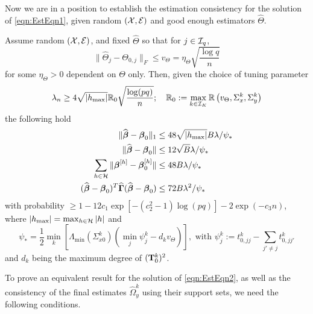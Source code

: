 \noindent Now we are in a position to establish the estimation consistency for the solution of \eqref{eqn:EstEqn1}, given random $({\cal{X}}, {\cal{E}})$ and good enough estimators $\widehat \Theta$.

\begin{Theorem}\label{thm:thm-B}
Assume random $({\cal{X}}, {\cal{E}})$, and fixed $\widehat \Theta$ so that for $j \in {\cal{I}}_q$,
%
\[
\| \widehat \Theta_j - \Theta_{0,j} \|_F \leq v_\Theta  = \eta_\Theta \sqrt{\frac{\log q}{n}}
\]
%
for some $\eta_\Theta > 0$ dependent on $\Theta$ only. Then, given the choice of tuning parameter
%
$$
\lambda_n \geq 4 \sqrt{| h_{\max} |} {\mathbb{R}}_0 \sqrt{ \frac{ \log(pq)}{n}}; \quad 
{\mathbb{R}}_0 := \max_{k \in {\cal{I}}_K} {\mathbb{R}} \left(v_\Theta, \Sigma_x^k, \Sigma_y^k \right)
$$
%
the following hold
%
\begin{align}
\| \widehat {{\boldsymbol{\beta}}} - {\boldsymbol{\beta}}_0 \|_1 & \leq 48 \sqrt{ | h_{\max} |} B \lambda/ \psi_* \label{eqn:BetaThmEqn1}\\
\| \widehat {{\boldsymbol{\beta}}} - {\boldsymbol{\beta}}_0 \| & \leq 12 \sqrt B \lambda/ \psi_* \label{eqn:BetaThmEqn2}\\
\sum_{h \in {\cal{H}}} \| {\boldsymbol{\beta}}^{[h]} - {\boldsymbol{\beta}}_0^{[h]} \| & \leq 48 B \lambda/ \psi_* \label{eqn:BetaThmEqn3}\\
(\widehat {{\boldsymbol{\beta}}} - {\boldsymbol{\beta}}_0 )^T \widehat {{\boldsymbol{\Gamma}}} (\widehat {{\boldsymbol{\beta}}} - {\boldsymbol{\beta}}_0 ) & \leq
72 B \lambda^2 / \psi_* \label{eqn:BetaThmEqn4}
\end{align}
%
with probability $\geq 1 - 12 c_1 \exp[-(c_2^2-1) \log(pq)] - 2 \exp( -c_3 n)$, where $|h_{\max}| = \max_{h \in {\cal{H}}} |h|$ and
%
$$
\psi_*= \frac{1}{2} \min_k \left[ \Lambda_{\min} (\Sigma_{x 0}^k) \left( \min_j \psi_j^k - d_k v_\Theta \right) \right],
\text{ with }
\psi_j^k := t_{0,jj}^k - \sum_{j' \neq j} t_{0,jj'}^k
$$
%
and $d_k$ being the maximum degree of $({\mathbf{T}}_0^k)^2$.
\end{Theorem}


To prove an equivalent result for the solution of \eqref{eqn:EstEqn2}, as well as the consistency of the final estimates $\widehat \Omega_y^k$ using their support sets, we need the following conditions.

